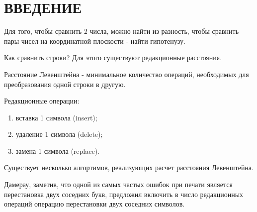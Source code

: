 \section*{ВВЕДЕНИЕ}

Для того, чтобы сравнить 2 числа, можно найти из разность, чтобы сравнить пары чисел на координатной плоскости - найти гипотенузу.\par
Как сравнить строки? Для этого существуют редакционные расстояния.\par
Расстояние Левенштейна - минимальное количество операций, необходимых для преобразования одной строки в другую.\par
Редакционные операции:
\begin{enumerate}[leftmargin=1.6\parindent]
    \item вставка 1 символа (insert);
    \item удаление 1 символа (delete);
    \item замена 1 символа (replace).
\end{enumerate}

Существует несколько алгортимов, реализующих расчет расстояния Левенштейна.\par
Дамерау, заметив, что одной из самых частых ошибок при печати является перестановка двух соседних букв, 
предложил включить в число редакционных операций операцию перестановки двух соседних символов.

\pagebreak